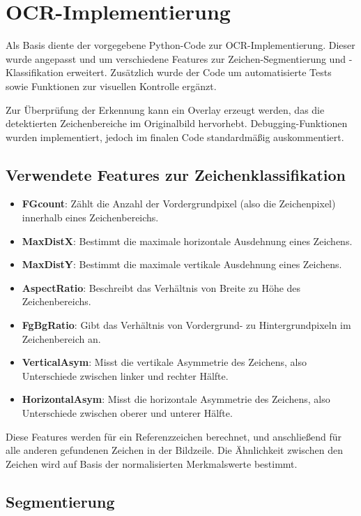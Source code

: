 \section{OCR-Implementierung}

Als Basis diente der vorgegebene Python-Code zur OCR-Implementierung. Dieser wurde angepasst und um verschiedene Features zur Zeichen-Segmentierung und -Klassifikation erweitert. Zusätzlich wurde der Code um automatisierte Tests sowie Funktionen zur visuellen Kontrolle ergänzt.

Zur Überprüfung der Erkennung kann ein Overlay erzeugt werden, das die detektierten Zeichenbereiche im Originalbild hervorhebt. Debugging-Funktionen wurden implementiert, jedoch im finalen Code standardmäßig auskommentiert.

\subsection{Verwendete Features zur Zeichenklassifikation}

\begin{itemize}
    \item \textbf{FGcount}: Zählt die Anzahl der Vordergrundpixel (also die Zeichenpixel) innerhalb eines Zeichenbereichs.
    \item \textbf{MaxDistX}: Bestimmt die maximale horizontale Ausdehnung eines Zeichens.
    \item \textbf{MaxDistY}: Bestimmt die maximale vertikale Ausdehnung eines Zeichens.
    \item \textbf{AspectRatio}: Beschreibt das Verhältnis von Breite zu Höhe des Zeichenbereichs.
    \item \textbf{FgBgRatio}: Gibt das Verhältnis von Vordergrund- zu Hintergrundpixeln im Zeichenbereich an.
    \item \textbf{VerticalAsym}: Misst die vertikale Asymmetrie des Zeichens, also Unterschiede zwischen linker und rechter Hälfte.
    \item \textbf{HorizontalAsym}: Misst die horizontale Asymmetrie des Zeichens, also Unterschiede zwischen oberer und unterer Hälfte.
\end{itemize}

Diese Features werden für ein Referenzzeichen berechnet, und anschließend für alle anderen gefundenen Zeichen in der Bildzeile. Die Ähnlichkeit zwischen den Zeichen wird auf Basis der normalisierten Merkmalswerte bestimmt.

\subsection{Segmentierung}

